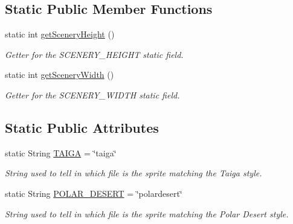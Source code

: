 \subsection*{Static Public Member Functions}
\begin{DoxyCompactItemize}
\item 
static int \hyperlink{a00024_ad49a4c8ba7e7c464b49b30efea953a66}{get\-Scenery\-Height} ()
\begin{DoxyCompactList}\small\item\em Getter for the S\-C\-E\-N\-E\-R\-Y\-\_\-\-H\-E\-I\-G\-H\-T static field. \end{DoxyCompactList}\item 
static int \hyperlink{a00024_ab0ba1fc1e7266f25ac7b1b7d36d2b5b8}{get\-Scenery\-Width} ()
\begin{DoxyCompactList}\small\item\em Getter for the S\-C\-E\-N\-E\-R\-Y\-\_\-\-W\-I\-D\-T\-H static field. \end{DoxyCompactList}\end{DoxyCompactItemize}
\subsection*{Static Public Attributes}
\begin{DoxyCompactItemize}
\item 
static String \hyperlink{a00028_ad3418d8f4936efb0ef1e3eb2009a34f0}{T\-A\-I\-G\-A} = \char`\"{}taiga\char`\"{}
\begin{DoxyCompactList}\small\item\em String used to tell in which file is the sprite matching the Taiga style. \end{DoxyCompactList}\item 
static String \hyperlink{a00019_a48dd1801e0146ea2306dadcbdee81b77}{P\-O\-L\-A\-R\-\_\-\-D\-E\-S\-E\-R\-T} = \char`\"{}polardesert\char`\"{}
\begin{DoxyCompactList}\small\item\em String used to tell in which file is the sprite matching the Polar Desert style. \end{DoxyCompactList}\end{DoxyCompactItemize}
